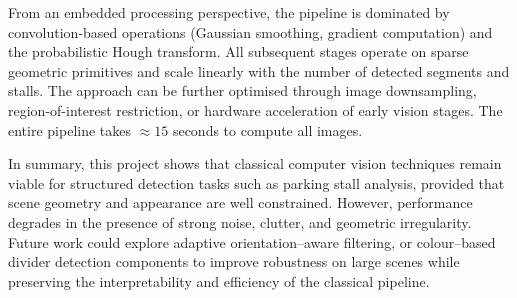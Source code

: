 \documentclass[9pt,journal]{IEEEtran}
\begin{document}
	From an embedded processing perspective, the pipeline is dominated by convolution-based operations (Gaussian smoothing, gradient computation) and the probabilistic Hough transform. All subsequent stages operate on sparse geometric primitives and scale linearly with the number of detected segments and stalls. The approach can be further optimised through image downsampling, region-of-interest restriction, or hardware acceleration of early vision stages. The entire pipeline takes $\approx15$ seconds to compute all images.
	
	In summary, this project shows that classical computer vision techniques remain viable for structured detection tasks such as parking stall analysis, provided that scene geometry and appearance are well constrained. However, performance degrades in the presence of strong noise, clutter, and geometric irregularity. Future work could explore adaptive orientation--aware filtering, or colour--based divider detection components to improve robustness on large scenes while preserving the interpretability and efficiency of the classical pipeline.
\end{document}
